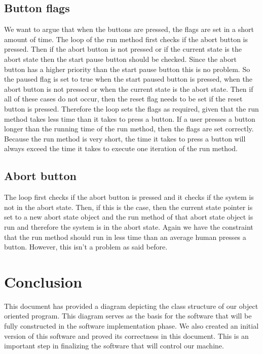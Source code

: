 \documentclass[a4paper,oneside,11pt]{article}
\begin{document}
\subsection{Button flags}
We want to argue that when the buttons are pressed, the flags are set in a short amount of time. The loop of the run method first checks if the abort button is pressed. Then if the abort button is not pressed or if the current state is the abort state then the start pause button should be checked. Since the abort button has a higher priority than the start pause button this is no problem. So the paused flag is set to true when the start paused button is pressed, when the abort button is not pressed or when the current state is the abort state. Then if all of these cases do not occur, then the reset flag needs to be set if the reset button is pressed. Therefore the loop sets the flags as required, given that the run method takes less time than it takes to press a button. If a user presses a button longer than the running time of the run method, then the flags are set correctly. Because the run method is very short, the time it takes to press a button will always exceed the time it takes to execute one iteration of the run method.

\subsection{Abort button}
The loop first checks if the abort button is pressed and it checks if the system is not in the abort state. Then, if this is the case, then the current state pointer is set to a new abort state object and the run method of that abort state object is run and therefore the system is in the abort state. Again we have the constraint that the run method should run in less time than an average human presses a button. However, this isn’t a problem as said before.

\section{Conclusion}
This document has provided a diagram depicting the class structure of our object oriented program. This diagram serves as the basis for the software that will be fully constructed in the software implementation phase. We also created an initial version of this software and proved its correctness in this document. This is an important step in finalizing the software that will control our machine.
\end{document}
